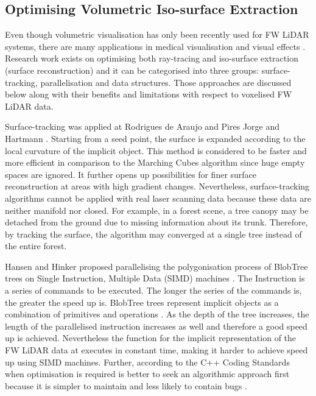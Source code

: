 \documentclass{subfiles}
\begin{document}
\subsection{Optimising Volumetric Iso-surface Extraction}
\par Even though volumetric visualisation has only been recently used for FW LiDAR systems, there are many applications in medical visualisation \cite{Levoy1998} \cite{Hadwiger2012} and visual effects \cite{Crassin2009} \cite{Laine2011SparseOctrees}. Research work exists on optimising both ray-tracing and iso-surface extraction (surface reconstruction) and it can be categorised into three groups: surface-tracking, parallelisation and data structures. Those approaches are discussed below along with their benefits and limitations with respect to voxelised FW LiDAR data.

\par Surface-tracking was applied at Rodrigues de Araujo and Pires Jorge \cite{Rodrigues2005} and Hartmann \cite{Hartmann1998}. Starting from a seed point, the surface is expanded according to the local curvature of the implicit object. This method is considered to be faster and more efficient in comparison to the Marching Cubes algorithm since huge empty spaces are ignored. It further opens up possibilities for finer surface reconstruction at areas with high {\color{red}gradient} changes. Nevertheless, surface-tracking algorithms cannot be applied with real laser scanning data because these data are neither manifold nor closed. For example, in a forest scene, a tree canopy may be detached from the ground due to missing information about its trunk. Therefore, by tracking the surface, the algorithm may converged at a single tree instead of the entire forest.  

\par Hansen and Hinker proposed parallelising the polygonisation process of BlobTree trees on Single Instruction, Multiple Data (SIMD) machines \cite{Hansen1992}. {\color{blue}The Instruction is a series of commands to be executed. The longer the series of the commands is, the greater the speed up is. BlobTree trees represent implicit objects as a combination of primitives and operations \cite{Galbraith2004}. As the depth of the tree increases, the length of the parallelised instruction increases as well and therefore a good speed up is achieved}. Nevertheless the function for the implicit representation of the FW LiDAR data at \cite{Miltiadou2014} executes in constant time, making it harder to achieve speed up using SIMD machines. Further, according to the C++ Coding Standards when optimisation is required is better to seek an algorithmic approach first because it is simpler to maintain and less likely to contain bugs \cite{Sutter2004}. 
\end{document}
